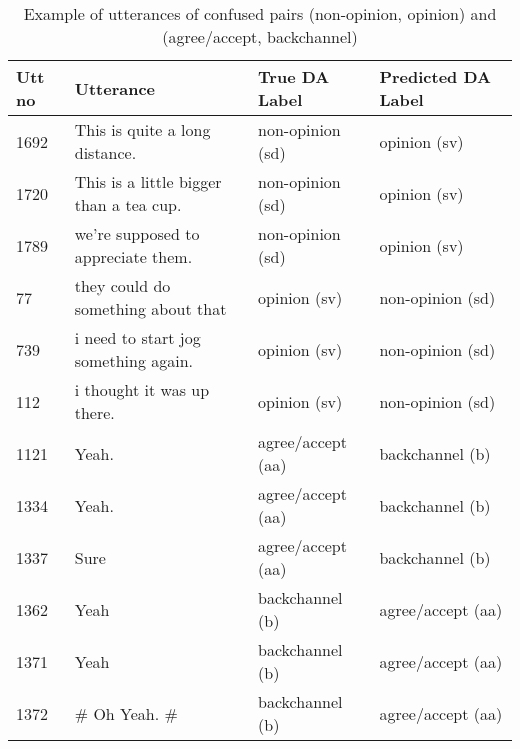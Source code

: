 \documentclass[letterpaper]{article} \usepackage{aaai18}
\begin{document}
\begin{table*}[bp]
  \centering
  \small
  \begin{tabular}{|l|l|l|l|}
    \hline
    Utt no & Utterance                               & True DA Label 		& Predicted DA Label	\\\hline
    1692   & This is quite a long distance.          & non-opinion (sd)		& opinion (sv) 			\\
    1720   & This is a little bigger than a tea cup. & non-opinion (sd)		& opinion (sv)			\\
    1789   & we're supposed to appreciate them.      & non-opinion (sd)		& opinion (sv)			\\\hline
    77     & they could do something about that      & opinion (sv)			& non-opinion (sd)		\\
    739    & i need to start jog something again.    & opinion (sv)			& non-opinion (sd)		\\
    112    & i thought it was up there.              & opinion (sv)			& non-opinion (sd)		\\\hline
    1121   & Yeah.                                   & agree/accept (aa)	& backchannel (b)		\\
    1334   & Yeah.                                   & agree/accept (aa)	& backchannel (b)		\\
    1337   & Sure                                    & agree/accept (aa)	& backchannel (b)		\\\hline
    1362   & Yeah                                    & backchannel (b)		& agree/accept (aa)		\\
    1371   & Yeah                                    & backchannel (b)		& agree/accept (aa)		\\
    1372   & \# Oh Yeah. \#                          & backchannel (b)		& agree/accept (aa)		\\\hline
  \end{tabular}
  \caption{Example of utterances of confused pairs (non-opinion, opinion) and (agree/accept, backchannel)}
  \label{table:confusedpairs}
\end{table*}
\end{document}
